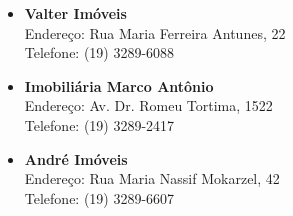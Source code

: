 \begin{itemize}
\item   \textbf{Valter Imóveis}
        \\Endereço: Rua Maria Ferreira Antunes, 22
        \\Telefone: (19) 3289-6088

\item   \textbf{Imobiliária Marco Antônio}
        \\Endereço: Av. Dr. Romeu Tortima, 1522
        \\Telefone: (19) 3289-2417

\item   \textbf{André Imóveis}
        \\Endereço: Rua Maria Nassif Mokarzel, 42
        \\Telefone: (19) 3289-6607

\end{itemize}
